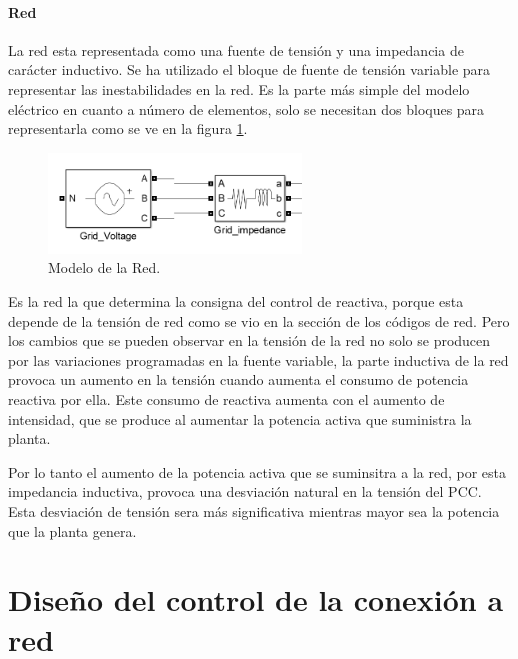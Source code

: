 \documentclass{book}
\begin{document}
		\paragraph{Red} 

La red esta representada como una fuente de tensi\'on y una impedancia de car\'acter inductivo. Se ha utilizado el bloque de fuente de tensi\'on variable para representar las inestabilidades en la red. Es la parte más simple del modelo el\'ectrico en cuanto a n\'umero de elementos, solo se necesitan dos bloques para representarla como se ve en la figura \ref{GridSimulink}. \par

\begin{figure}[h!]
\centering
\includegraphics[width=0.6\textwidth]{GridSimulink.PNG}
\caption{Modelo de la Red. }
\label{GridSimulink}
\end{figure} \par

Es la red la que determina la consigna del control de reactiva, porque esta depende de la tensi\'on de red como se vio en la secci\'on de los c\'odigos de red. Pero los cambios que se pueden observar en la tensi\'on de la red no solo se producen por las variaciones programadas en la fuente variable, la parte inductiva de la red provoca un aumento en la tensi\'on cuando aumenta el consumo de potencia reactiva por ella. Este consumo de reactiva aumenta con el aumento de intensidad, que se produce al aumentar la potencia activa que suministra la planta.  \par

Por lo tanto el aumento de la potencia activa que se suminsitra a la red, por esta impedancia inductiva, provoca una desviaci\'on natural en la tensi\'on del PCC. Esta desviaci\'on de tensi\'on sera m\'as significativa mientras mayor sea la potencia que la planta genera. \par

	\section{Diseño del control de la conexi\'on a red}
\end{document}
